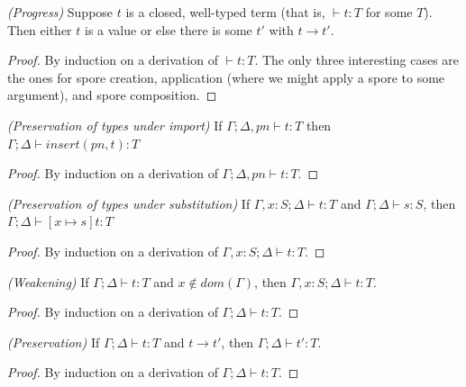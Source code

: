 \documentclass{llncs}
\begin{document}
\begin{theorem}
\emph{(Progress)}
\label{th:progress}
Suppose $t$ is a closed, well-typed term (that is, $\vdash t : T$ for some $T$). Then either $t$ is a value or else there is some $t'$ with $t \rightarrow t'$.
\vspace{-2.5mm}
\end{theorem}
\begin{proof}
By induction on a derivation of $\vdash t : T$. The only three interesting cases are the ones for spore creation, application (where we might apply a spore to some argument), and spore composition.
\end{proof}


\begin{lemma}
\emph{(Preservation of types under import)}
\label{lem:pres-import}
If $\Gamma ; \Delta, pn \vdash t : T$ then $\Gamma ; \Delta \vdash insert(pn, t) : T$
\vspace{-2.5mm}
\end{lemma}
\begin{proof}
By induction on a derivation of $\Gamma ; \Delta, pn \vdash t : T$.
\end{proof}


\begin{lemma}
\emph{(Preservation of types under substitution)}
\label{lem:substitution}
If $\Gamma, x : S ; \Delta \vdash t : T$ and $\Gamma ; \Delta \vdash s : S$, then $\Gamma ; \Delta \vdash [x \mapsto s]t : T$
\vspace{-2.5mm}
\end{lemma}
\begin{proof}
By induction on a derivation of $\Gamma, x : S ; \Delta \vdash t : T$.
\end{proof}


\begin{lemma}
\emph{(Weakening)}
\label{lem:weak}
If $\Gamma ; \Delta \vdash t : T$ and $x \notin dom(\Gamma)$, then $\Gamma, x : S ; \Delta \vdash t : T$.
\vspace{-2.5mm}
\end{lemma}
\begin{proof}
By induction on a derivation of $\Gamma ; \Delta \vdash t : T$.
\end{proof}


\begin{theorem}
\emph{(Preservation)}
\label{th:pres}
If $\Gamma ; \Delta \vdash t : T$ and $t \rightarrow t'$, then $\Gamma ; \Delta \vdash t' : T$.
\vspace{-2.5mm}
\end{theorem}
\begin{proof}
By induction on a derivation of $\Gamma ; \Delta \vdash t : T$.
\end{proof}
\end{document}
